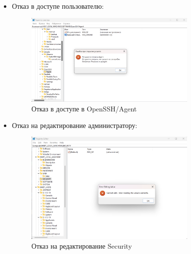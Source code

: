 \documentclass[a4paper, 14pt]{report}
\begin{document}
\begin{enumerate}
{\begin{itemize}
{\begin{itemize}
                        \item \textbf{SAM} — данные о пользователях и группах (Security Accounts Manager). Недоступна для обычных пользователей.
                        \item \textbf{Security} — политики безопасности. Недоступна для обычных пользователей.
                    \end{itemize}
                    }
              \item {Отказ в доступе пользователю:
                    \begin{figure}[H]
                        \centering
                        \includegraphics[width=0.8\textwidth]{../images/HKLM_denied.png}
                        \caption{Отказ в доступе в OpenSSH/Agent}
                    \end{figure}
                    }
              \item {Отказ на редактирование администратору:
                    \begin{figure}[H]
                        \centering
                        \includegraphics[width=0.8\textwidth]{../images/HKLM_admin.png}
                        \caption{Отказ на редактирование Security}
                    \end{figure}}
          \end{itemize}
}
\end{enumerate}
\end{document}
